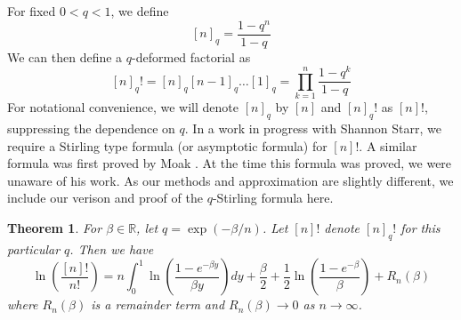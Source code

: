 \documentclass[12pt]{report}
\newtheorem{thm}{Theorem}[section]
\theoremstyle{definition}
\begin{document}
For fixed $0<q<1$, we define 
$$
[n]_q=\frac{1-q^n}{1-q}
$$
We can then define a $q$-deformed factorial as 
$$
[n]_q!=[n]_q[n-1]_q\dots[1]_q=\prod_{k=1}^n\frac{1-q^k}{1-q}
$$
For notational convenience, we will denote $[n]_q$ by $[n]$ and $[n]_q!$ as $[n]!$, suppressing the dependence on $q$.  In a work in progress with Shannon Starr, we require a Stirling type formula (or asymptotic formula) for $[n]!$.  A similar formula was first proved by Moak \cite{Moak}.  At the time this formula was proved, we were unaware of his work.  As our methods and approximation are slightly different, we include our verison and proof of the $q$-Stirling formula here.  
\begin{thm}
For $\beta\in\mathbb{R}$, let $q=\exp(-\beta/n)$.  Let $[n]!$ denote $[n]_q!$ for this particular $q$.  Then we have 
$$
\ln\left(\frac{[n]!}{n!}\right)=n\int_0^1\ln\left(\frac{1-e^{-\beta y}}{\beta{y}}\right)dy +\frac{\beta}{2}+\frac{1}{2}\ln\left(\frac{1-e^{-\beta}}{\beta}\right)+R_n(\beta)
$$
where $R_n(\beta)$ is a remainder term and $R_n(\beta)\rightarrow 0$ as $n\rightarrow\infty$. 
\end{thm}
\end{document}

